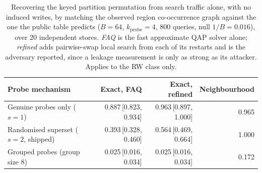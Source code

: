 \begin{table}[t]
\centering
\caption{Recovering the keyed partition permutation from search traffic alone, with no induced
writes, by matching the observed region co-occurrence graph against the one the public table
predicts ($B=64$, $k_{\mathrm{probe}}=4$, 800 queries,
null $1/B = 0.016$), over 20 independent stores.
\emph{FAQ} is the fast approximate QAP solver alone; \emph{refined} adds pairwise-swap local
search from each of its restarts and is the adversary reported, since a leakage measurement is only
as strong as its attacker. Applies to the RW class only.}
\label{tab:e7}
\small
\setlength{\tabcolsep}{4pt}
\begin{tabular}{lrrr}
\toprule
Probe mechanism & Exact, FAQ & Exact, refined & Neighbourhood \\
\midrule
Genuine probes only ($s=1$) & 0.887\,[0.823, 0.934] & 0.963\,[0.897, 1.000] & 0.965 \\
Randomised superset ($s=2$, shipped) & 0.393\,[0.328, 0.460] & 0.564\,[0.469, 0.664] & 1.000 \\
Grouped probes (group size 8) & 0.025\,[0.016, 0.034] & 0.025\,[0.016, 0.034] & 0.172 \\
\bottomrule
\end{tabular}
\end{table}
